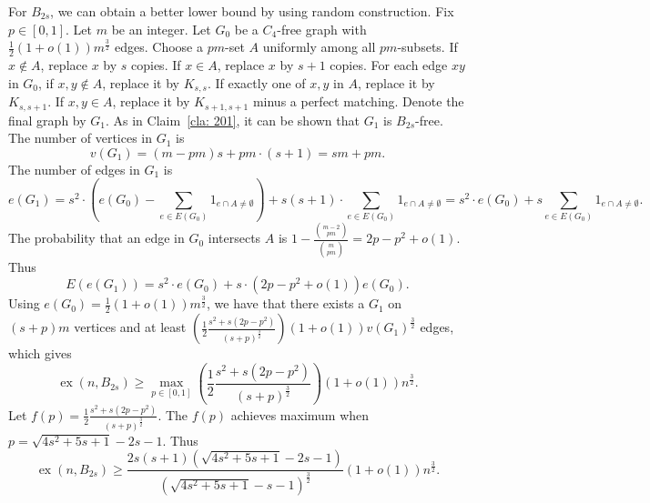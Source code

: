 \documentclass[11pt,a4paper]{article}
\theoremstyle{definition}
\DeclareMathOperator{\ex}{ex}
\begin{document}
        For $B_{2s}$, we can obtain a better lower bound by using random construction.
        Fix $p \in [0, 1]$.
        Let $m$ be an integer.
        Let $G_0$ be a $C_4$-free graph with $\frac{1}{2} (1+o(1))m^{\frac{3}{2}}$ edges.
        Choose a $pm$-set $A$ uniformly among all $pm$-subsets.
        If $x \notin A$, replace $x$ by $s$ copies.
        If $x \in A$, replace $x$ by $s+1$ copies.
        For each edge $xy$ in $G_0$,
        if $x, y \notin A$, replace it by $K_{s,s}$.
        If exactly one of $x, y$ in $A$, replace it by $K_{s,s+1}$.
        If $x, y \in A$, replace it by $K_{s+1,s+1}$ minus a perfect matching.
        Denote the final graph by $G_1$.
        As in Claim~\ref{cla: 201}, it can be shown that $G_1$ is $B_{2s}$-free. 
        The number of vertices in $G_1$ is
        \begin{equation*}
            v(G_1) = (m-pm)s + pm \cdot (s+1) = sm + pm.
        \end{equation*}
        The number of edges in $G_1$ is 
        \begin{equation*}
            e(G_1) = s^2 \cdot (e(G_0) - \sum_{e \in E(G_0)} 1_{e \cap A \neq \emptyset}) + s(s+1) \cdot \sum_{e \in E(G_0)} 1_{e \cap A \neq \emptyset} = s^2 \cdot e(G_0) + s \sum_{e \in E(G_0)} 1_{e \cap A \neq \emptyset}.
        \end{equation*}
        The probability that an edge in $G_0$ intersects $A$ is $1 - \frac{\binom{m-2}{pm}}{\binom{m}{pm}} = 2p - p^2 +o(1)$.
        Thus
        \begin{equation*}
            E(e(G_1)) = s^2 \cdot e(G_0) + s \cdot (2p - p^2 +o(1)) e(G_0).
        \end{equation*}
        Using $e(G_0) = \frac{1}{2}(1+o(1))m^{\frac{3}{2}}$, we have that there exists a $G_1$ on $(s+p)m$ vertices and at least $(\frac{1}{2} \frac{s^2+s(2p-p^2)}{(s+p)^{\frac{3}{2}}})(1+o(1))v(G_1)^{\frac{3}{2}}$ edges, which gives 
        \begin{equation*}
            \ex(n,B_{2s}) \geq \max_{p \in [0,1]} \left(\frac{1}{2} \frac{s^2+s(2p-p^2)}{(s+p)^{\frac{3}{2}}} \right)(1+o(1))n^{\frac{3}{2}}.
        \end{equation*}
        Let $f(p) = \frac{1}{2} \frac{s^2+s(2p-p^2)}{(s+p)^{\frac{3}{2}}}$.
        The $f(p)$ achieves maximum when $p = \sqrt{4s^2+5s+1} - 2s - 1$.
        Thus
        \begin{equation}
            \ex(n, B_{2s}) \geq \frac{2s(s+1)(\sqrt{4s^2+5s+1}-2s-1)}{(\sqrt{4s^2+5s+1}-s-1)^{\frac{3}{2}}}(1+o(1))n^{\frac{3}{2}}.
        \end{equation}
\end{document}
